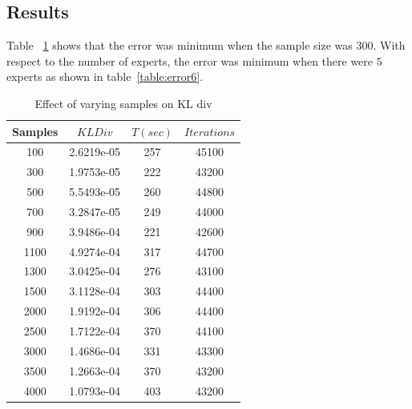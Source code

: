 \documentclass{sig-alternate}
\begin{document}
\subsection{ Results }
Table ~\ref{table:error5} shows that the error was minimum when the sample size was $300$. With respect to the number of experts, the error was minimum when there were $5$ experts as shown in table~\ref{table:error6}.
\begin{table}[htdp]
\begin{center}
\begin{tabular}{| c | c | c | c |}
\hline
Samples & $KL Div$ & $T(sec)$ & $Iterations$ \\
\hline
100 & 2.6219e-05 & 257 & 45100 \\
300 & 1.9753e-05 & 222 & 43200 \\
500 & 5.5493e-05 & 260 & 44800 \\
700 & 3.2847e-05 & 249 & 44000 \\
900 & 3.9486e-04 & 221 & 42600 \\
1100 & 4.9274e-04 & 317 & 44700 \\
1300 & 3.0425e-04 & 276 & 43100 \\
1500 &  3.1128e-04 & 303 & 44400\\
2000 & 1.9192e-04 & 306 & 44400\\
2500 & 1.7122e-04 & 370 & 44100 \\
3000 & 1.4686e-04 & 331 & 43300 \\
3500 & 1.2663e-04 & 370 & 43200 \\
4000 & 1.0793e-04 & 403 & 43200 \\
\hline
\end{tabular}
\end{center}
\caption{Effect of varying samples on KL div}
\label{table:error5}
\end{table}
\end{document}
